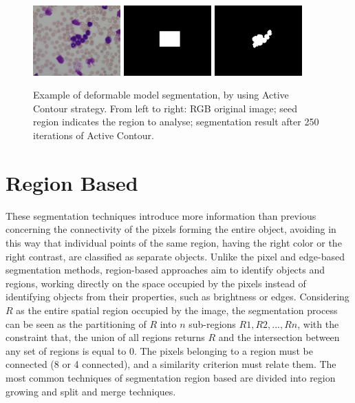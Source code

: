 \begin{figure}[h]
	\centering
	\includegraphics[width=0.3\textwidth]{images/figcs_rgb}
	\includegraphics[width=0.3\textwidth]{images/fig_snakes1}
	\includegraphics[width=0.3\textwidth]{images/fig_snakes2}
	\caption[Example of Active Contour.]{\label{fig:snakes}Example of deformable model segmentation, by using Active Contour strategy. From left to right: RGB original image; seed region indicates the region to analyse; segmentation result after 250 iterations of Active Contour.}
\end{figure}

\section{Region Based} 
These segmentation techniques introduce more information than previous concerning the connectivity of the pixels forming the entire object, avoiding in this way that individual points of the same region, having the right color or the right contrast, are classified as separate objects. Unlike the pixel and edge-based segmentation methods, region-based approaches aim to identify objects and regions, working directly on the space occupied by the pixels instead of identifying objects from their properties, such as brightness or edges. Considering $R$ as the entire spatial region occupied by the image, the segmentation process can be seen as the partitioning of $R$ into $n$ sub-regions $R1, R2, ..., Rn$, with the constraint that, the union of all regions returns $R$ and the intersection between any set of regions is equal to $0$. The pixels belonging to a region must be connected (8 or 4 connected), and a similarity criterion must relate them. The most common techniques of segmentation region based are divided into region growing and split and merge techniques.

